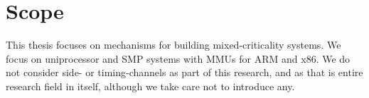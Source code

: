 \section{Scope}

This thesis focuses on mechanisms for building mixed-criticality systems. 
We focus on uniprocessor and \gls{SMP} systems with \glspl{MMU} for ARM and x86.
We do not consider side- or timing-channels as part of this research, and as that is entire research
field in itself, although we take care not to introduce any.
